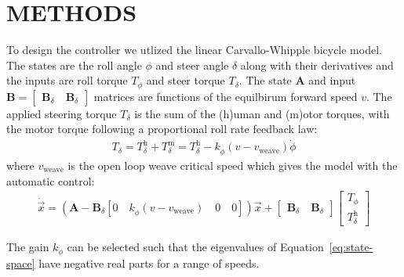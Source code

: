 \documentclass{icsc}
\begin{document}
\section{METHODS}
%
To design the controller we utlized the linear Carvallo-Whipple bicycle model.
The states are the roll angle \(\phi\) and steer angle \(\delta\) along with
their derivatives and the inputs are roll torque \(T_\phi\) and steer torque
\(T_\delta\). The state \(\mathbf{A}\) and input \(\mathbf{B} =
\begin{bmatrix}\mathbf{B}_\delta \quad \mathbf{B}_\delta\end{bmatrix} \)
matrices are functions of the equilbirum forward speed \(v\). The applied
steering torque \(T_\delta\) is the sum of the (h)uman and (m)otor torques,
with the motor torque following a proportional roll rate feedback law:
%
\begin{align}
  T_\delta =
  T_\delta^\textrm{h} + T_\delta^\textrm{m} =
  T_\delta^\textrm{h} - k_{\dot{\phi}}(v - v_\textrm{weave})\dot{\phi}
\end{align}
where \(v_\textrm{weave}\) is the open loop weave critical speed which gives
the model with the automatic control:
%
\begin{align}
  \dot{\vec{x}} =
  \left(
    \mathbf{A} - \mathbf{B}_\delta
    \left[0 \quad k_{\dot{\phi}}(v - v_\textrm{weave}) \quad 0 \quad 0\right]
  \right)
\vec{x} + \begin{bmatrix}\mathbf{B}_\delta \quad \mathbf{B}_\delta\end{bmatrix}
\begin{bmatrix} T_{\phi} \\ T_\delta^\textrm{h} \end{bmatrix}
\label{eq:state-space}
\end{align}

The gain \(k_{\dot{\phi}}\) can be selected such that the eigenvalues of
Equation~\ref{eq:state-space} have negative real parts for a range of speeds.
\end{document}
